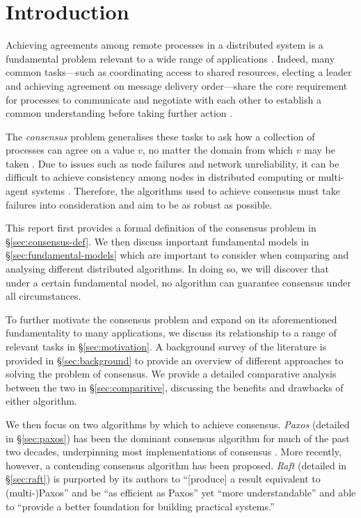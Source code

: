 \documentclass[12pt, a4paper]{article}
\begin{document}

\section{Introduction}

Achieving agreements among remote processes in a distributed system is a fundamental problem relevant to a wide range of applications \cite{fischer1985impossibility, kshemkalyani_singhal_2008}. Indeed, many common tasks---such as coordinating access to shared resources, electing a leader and achieving agreement on message delivery order---share the core requirement for processes to communicate and negotiate with each other to establish a common understanding before taking further action \cite{kshemkalyani_singhal_2008, coulouris2005distributed}.

The \textit{consensus} problem generalises these tasks to ask how a collection of processes can agree on a value $v$, no matter the domain from which $v$ may be taken \cite{coulouris2005distributed}. Due to issues such as node failures and network unreliability, it can be difficult to achieve consistency among nodes in distributed computing or multi-agent systems \cite{coulouris2005distributed}. Therefore, the algorithms used to achieve consensus must take failures into consideration and aim to be as robust as possible.

This report first provides a formal definition of the consensus problem in \S\ref{sec:consensus-def}. We then discuss important fundamental models in \S\ref{sec:fundamental-models} which are important to consider when comparing and analysing different distributed algorithms. In doing so, we will discover that under a certain fundamental model, no algorithm can guarantee consensus under all circumstances.

To further motivate the consensus problem and expand on its aforementioned fundamentality to many applications, we discuss its relationship to a range of relevant tasks in \S\ref{sec:motivation}. A background survey of the literature is provided in \S\ref{sec:background} to provide an overview of different approaches to solving the problem of consensus. We provide a detailed comparative analysis between the two in \S\ref{sec:comparitive}, discussing the benefits and drawbacks of either algorithm.

We then focus on two algorithms by which to achieve consensus. \textit{Paxos} \cite{lamport1998part, lamport2001paxos} (detailed in \S\ref{sec:paxos}) has been the dominant consensus algorithm for much of the past two decades, underpinning most implementations of consensus \cite{ongaro2014search}. More recently, however, a contending consensus algorithm has been proposed. \textit{Raft} \cite{ongaro2014search} (detailed in \S\ref{sec:raft}) is purported by its authors to ``[produce] a result equivalent to (multi-)Paxos'' and be ``as efficient as Paxos'' yet ``more understandable'' and able to ``provide a better foundation for building practical systems.'' \cite{ongaro2014search}
\end{document}
